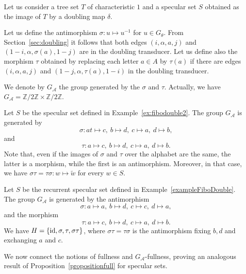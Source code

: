 \documentclass[preprint,12pt]{elsarticle}
\newcommand{\Z}{\mathbb{Z}}
\def\id{{\rm id}}
\numberwithin{theorem}{section}
\numberwithin{equation}{section}
\numberwithin{figure}{section}
\numberwithin{table}{section}
\begin{document}
Let us consider a tree set $T$ of characteristic $1$ and a specular set $S$ obtained as the image of $T$ by a doubling map $\delta$.

Let us define the antimorphism $\sigma: u \mapsto u^{-1}$ for $u\in G_\theta$.
From Section~\ref{sec:doubling} it follows that both edges $(i, \alpha, a, j)$ and $(1-i, \alpha, \sigma(a), 1-j)$ are in the doubling transducer.
Let us define also the morphism $\tau$ obtained by replacing each letter $a\in A$ by $\tau(a)$ if there are edges $(i,\alpha,a,j)$ and $(1-j,\alpha,\tau(a),1-i)$ in the doubling transducer.

We denote by $G_\mathcal{A}$ the group generated by the $\sigma$ and $\tau$.
Actually, we have $G_\mathcal{A} = \Z/2\Z \times \Z/2\Z$.

\begin{example}
\label{ex:h2}
Let $S$ be the specular set defined in Example~\ref{ex:fibodouble2}.
The group $G_\mathcal{A}$ is generated by
$$\sigma : a t\mapsto c, \ b \mapsto d, \ c \mapsto a, \ d \mapsto b,$$
and
$$\tau : a \mapsto c, \ b \mapsto d, \ c \mapsto a, \ d \mapsto b.$$
Note that, even if the images of $\sigma$ and $\tau$ over the alphabet are the same, the latter is a morphism, while the first is an antimorphism.
Moreover, in that case, we have $\sigma \tau = \tau \sigma : w \mapsto \tilde{w}$ for every $w \in S$.
\end{example}

\begin{example}
\label{ex:h}
Let $S$ be the recurrent specular set defined in Example~\ref{exampleFiboDouble}.
The group $G_\mathcal{A}$ is generated by the antimorphism
$$\sigma : a \mapsto a, \ b \mapsto d, \ c \mapsto c, \ d \mapsto a,$$
and the morphism
$$\tau : a \mapsto c, \ b \mapsto d, \ c \mapsto a, \ d \mapsto b.$$
We have $H = \{ \id, \sigma, \tau, \sigma \tau \}$, where $\sigma \tau = \tau \sigma$ is the antimorphism fixing $b,d$ and exchanging $a$ and $c$.

\end{example}

We now connect the notions of fullness and $G_\mathcal{A}$-fullness, proving an analogous result of Proposition~\ref{propositionfull} for specular sets.
\end{document}
